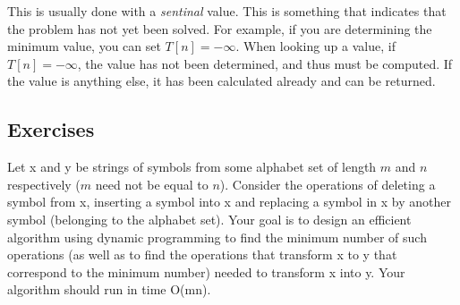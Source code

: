 This is usually done with a \textit{sentinal} value. This is something that indicates that the problem has not yet been solved. For example, if you are determining the minimum value, you can set $T[n]=-\infty$. When looking up a value, if $T[n]=-\infty$, the value has not been determined, and thus must be computed. If the value is anything else, it has been calculated already and can be returned.

\subsection{Exercises}
\begin{exercise}{}{}
    Let x and y be strings of symbols from some alphabet set of length $m$ and $n$ respectively ($m$ need not be equal to $n$). Consider the operations of deleting a symbol from x, inserting a symbol into x and replacing a symbol in x by another symbol (belonging to the alphabet set). Your goal is to design an efficient algorithm using dynamic programming to find the minimum number of such operations (as well as to find the operations that transform x to y that correspond to the minimum number) needed to transform x into y. Your algorithm should run in time O(mn).
\end{exercise}

